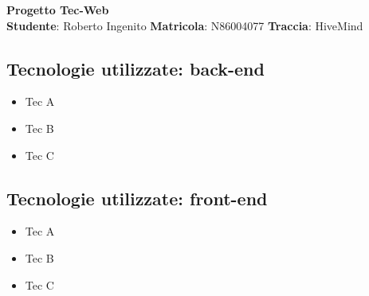 \documentclass[12pt]{report}
\begin{document}
{\centering \LARGE \bfseries Progetto Tec-Web \\}
\bigskip\bigskip \noindent
\textbf{Studente}: Roberto Ingenito \qquad \textbf{Matricola}: N86004077 \qquad \textbf{Traccia}: HiveMind

\subsection*{Tecnologie utilizzate: back-end}
\begin{itemize}
    \item Tec A
    \item Tec B
    \item Tec C
\end{itemize}

\subsection*{Tecnologie utilizzate: front-end}
\begin{itemize}
    \item Tec A
    \item Tec B
    \item Tec C
\end{itemize}
\end{document}
